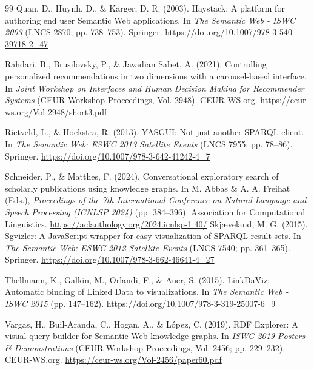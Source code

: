 \documentclass[manuscript,review,screen]{acmart}
\begin{document}
\begin{thebibliography}{99}
 Quan, D., Huynh, D., \& Karger, D. R. (2003). Haystack: A platform for authoring end user Semantic Web applications. In \textit{The Semantic Web - ISWC 2003} (LNCS 2870; pp. 738--753). Springer. \url{https://doi.org/10.1007/978-3-540-39718-2_47}

 Rahdari, B., Brusilovsky, P., \& Javadian Sabet, A. (2021). Controlling personalized recommendations in two dimensions with a carousel-based interface. In \textit{Joint Workshop on Interfaces and Human Decision Making for Recommender Systems} (CEUR Workshop Proceedings, Vol. 2948). CEUR-WS.org. \url{https://ceur-ws.org/Vol-2948/short3.pdf}

 Rietveld, L., \& Hoekstra, R. (2013). YASGUI: Not just another SPARQL client. In \textit{The Semantic Web: ESWC 2013 Satellite Events} (LNCS 7955; pp. 78--86). Springer. \url{https://doi.org/10.1007/978-3-642-41242-4_7}

 Schneider, P., \& Matthes, F. (2024). Conversational exploratory search of scholarly publications using knowledge graphs. In M. Abbas \& A. A. Freihat (Eds.), \textit{Proceedings of the 7th International Conference on Natural Language and Speech Processing (ICNLSP 2024)} (pp. 384--396). Association for Computational Linguistics. \url{https://aclanthology.org/2024.icnlsp-1.40/}
 Skj\ae{}veland, M. G. (2015). Sgvizler: A JavaScript wrapper for easy visualization of SPARQL result sets. In \textit{The Semantic Web: ESWC 2012 Satellite Events} (LNCS 7540; pp. 361--365). Springer. \url{https://doi.org/10.1007/978-3-662-46641-4_27}

 Thellmann, K., Galkin, M., Orlandi, F., \& Auer, S. (2015). LinkDaViz: Automatic binding of Linked Data to visualizations. In \textit{The Semantic Web - ISWC 2015} (pp. 147--162). \url{https://doi.org/10.1007/978-3-319-25007-6_9}

 Vargas, H., Buil-Aranda, C., Hogan, A., \& L\'{o}pez, C. (2019). RDF Explorer: A visual query builder for Semantic Web knowledge graphs. In \textit{ISWC 2019 Posters \& Demonstrations} (CEUR Workshop Proceedings, Vol. 2456; pp. 229--232). CEUR-WS.org. \url{https://ceur-ws.org/Vol-2456/paper60.pdf}


\end{thebibliography}
\end{document}
